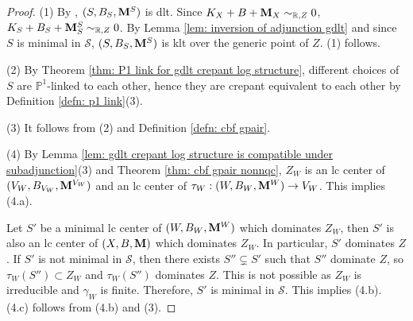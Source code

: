 \documentclass[11pt]{amsart}
\numberwithin{equation}{section}
\newcommand{\Mm}{{\bf{M}}}
\theoremstyle{definition}
\theoremstyle{definition}
\theoremstyle{definition}
\begin{document}
\begin{proof}
(1) By \cite[Lemma 2.9]{HL22}, $(S,B_S,\Mm^S)$ is dlt. Since $K_X+B+\Mm_X\sim_{\mathbb R,Z}0$, $K_S+B_S+\Mm^S_S\sim_{\mathbb R,Z}0$. By Lemma \ref{lem: inversion of adjunction gdlt} and since $S$ is minimal in $\mathcal{S}$, $(S,B_S,\Mm^S)$ is klt over the generic point of $Z$. (1) follows.

(2) By Theorem \ref{thm: P1 link for gdlt crepant log structure}, different choices of $S$ are $\mathbb P^1$-linked to each other, hence they are crepant equivalent to each other by Definition \ref{defn: p1 link}(3). 

(3) It follows from (2) and Definition \ref{defn: cbf gpair}.

(4) By Lemma \ref{lem: gdlt crepant log structure is compatible under subadjunction}(3) and Theorem \ref{thm: cbf gpair nonnqc}, $Z_W$ is an lc center of $(V_W,B_{V_W},\Mm^{V_W})$ and an lc center of $\tau_W: (W,B_W,\Mm^W)\rightarrow V_W$. This implies (4.a).

Let $S'$ be a minimal lc center of $(W,B_W,\Mm^W)$ which dominates $Z_W$, then $S'$ is also an lc center of $(X,B,\Mm)$ which dominates $Z_W$. In particular, $S'$ dominates $Z$. If $S'$ is not minimal in $\mathcal{S}$, then there exists $S''\subsetneq S'$ such that $S''$ dominate $Z$, so $\tau_W(S'')\subset Z_W$ and $\tau_W(S'')$ dominates $Z$. This is not possible as $Z_W$ is irreducible and $\gamma_W$ is finite. Therefore, $S'$ is minimal in $\mathcal{S}$. This implies (4.b). (4.c) follows from (4.b) and (3).
\end{proof}
\end{document}
